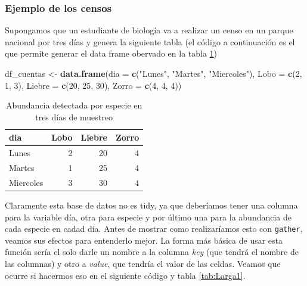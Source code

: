 \documentclass[]{book}
\newenvironment{Shaded}{\begin{snugshade}}{\end{snugshade}}
\newcommand{\DataTypeTok}[1]{\textcolor[rgb]{0.13,0.29,0.53}{#1}}
\newcommand{\DecValTok}[1]{\textcolor[rgb]{0.00,0.00,0.81}{#1}}
\newcommand{\KeywordTok}[1]{\textcolor[rgb]{0.13,0.29,0.53}{\textbf{#1}}}
\newcommand{\NormalTok}[1]{#1}
\newcommand{\StringTok}[1]{\textcolor[rgb]{0.31,0.60,0.02}{#1}}
\begin{document}
\hypertarget{ejemplo-de-los-censos}{%
\subsubsection{Ejemplo de los censos}\label{ejemplo-de-los-censos}}

Supongamos que un estudiante de biología va a realizar un censo en un
parque nacional por tres días y genera la siguiente tabla (el código a
continuación es el que permite generar el data frame obervado en la
tabla \ref{tab:Censo})

\begin{Shaded}
\begin{Highlighting}[]
\NormalTok{df_cuentas <-}\StringTok{ }\KeywordTok{data.frame}\NormalTok{(}\DataTypeTok{dia =} \KeywordTok{c}\NormalTok{(}\StringTok{"Lunes"}\NormalTok{, }\StringTok{"Martes"}\NormalTok{, }\StringTok{"Miercoles"}\NormalTok{), }
    \DataTypeTok{Lobo =} \KeywordTok{c}\NormalTok{(}\DecValTok{2}\NormalTok{, }\DecValTok{1}\NormalTok{, }\DecValTok{3}\NormalTok{), }\DataTypeTok{Liebre =} \KeywordTok{c}\NormalTok{(}\DecValTok{20}\NormalTok{, }\DecValTok{25}\NormalTok{, }\DecValTok{30}\NormalTok{), }\DataTypeTok{Zorro =} \KeywordTok{c}\NormalTok{(}\DecValTok{4}\NormalTok{, }\DecValTok{4}\NormalTok{, }
        \DecValTok{4}\NormalTok{))}
\end{Highlighting}
\end{Shaded}

\begin{table}

\caption{\label{tab:Censo}Abundancia detectada por especie en tres días de muestreo}
\centering
\begin{tabular}[t]{lrrr}
\toprule
dia & Lobo & Liebre & Zorro\\
\midrule
Lunes & 2 & 20 & 4\\
Martes & 1 & 25 & 4\\
Miercoles & 3 & 30 & 4\\
\bottomrule
\end{tabular}
\end{table}

Claramente esta base de datos no es tidy, ya que deberíamos tener una
columna para la variable día, otra para especie y por último una para la
abundancia de cada especie en cadad día. Antes de mostrar como
realizaríamos esto con \texttt{gather}, veamos sus efectos para
entenderlo mejor. La forma más básica de usar esta función sería el solo
darle un nombre a la columna \emph{key} (que tendrá el nombre de las
columnas) y otro a \emph{value}, que tendría el valor de las celdas.
Veamos que ocurre si hacermos eso en el siguiente código y tabla
\ref{tab:Larga1}.
\end{document}
